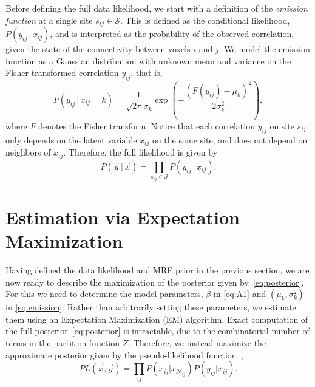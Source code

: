 \documentclass[runningheads,a4paper]{llncs}
\begin{document}
Before defining the full data likelihood, we start with a definition of the {\em
  emission function} at a single site $s_{ij} \in \mathcal{S}$. This is defined
as the conditional likelihood, $P(y_{ij} \, | \, x_{ij})$, and is interpreted as
the probability of the observed correlation, given the state of the connectivity
between voxels $i$ and $j$. We model the emission function as a Gaussian
distribution with unknown mean and variance on the Fisher transformed
correlation $y_{ij}$, that is,
\begin{equation}
\label{eq:emission}
P(y_{ij} \,|\, x_{ij} = k) = \frac{1}{\sqrt{2\pi} \sigma_k} \exp \left( -\frac{(F(y_{ij}) -  \mu_k)^2}{2\sigma_k^2}\right),
\end{equation}
where $F$ denotes the Fisher transform. Notice that each correlation $y_{ij}$ on
site $s_{ij}$ only depends on the latent variable $x_{ij}$ on the same site, and
does not depend on neighbors of $x_{ij}$. Therefore, the full likelihood is
given by
\begin{equation}
\label{eq:likelihood}
P(\vec y \, | \, \vec x) = \prod_{s_{ij}\in\mathcal{S}} P(y_{ij} \, | \, x_{ij}).
\end{equation}

\section{Estimation via Expectation Maximization}
\label{sec:algorithm}
Having defined the data likelihood and MRF prior in the previous section, we are
now ready to describe the maximization of the posterior given
by~\eqref{eq:posterior}. For this we need to determine the model parameters,
$\beta$ in \eqref{eq:A1} and $(\mu_k, \sigma_k^2)$ in
\eqref{eq:emission}. Rather than arbitrarily setting these parameters, we
estimate them using an Expectation Maximization (EM) algorithm. Exact
computation of the full posterior~\eqref{eq:posterior} is intractable, due to
the combinatorial number of terms in the partition function $Z$. Therefore, we
instead maximize the approximate posterior given by the pseudo-likelihood
function~\cite{li_markov_2009,besag_spatial_1974},
\begin{equation}
PL(\vec x, \vec y) = \prod_{ij}^{}P (x_{ij}|x_{\mathcal{N}_{ij}}) P(y_{ij}|x_{ij}). \label{eq:2}
\end{equation}

\end{document}
